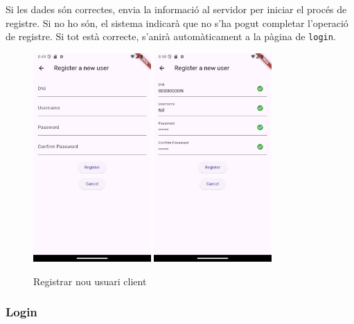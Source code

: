 \documentclass[a4paper,12pt,twoside]{ThesisStyle}
\begin{document}
Si les dades són correctes, envia la informació al servidor per iniciar el procés de registre. Si no ho són, el sistema indicarà que no s'ha pogut completar l'operació de registre. Si tot està correcte, s'anirà automàticament a la pàgina de \texttt{login}.

\begin{figure}[h]
    \centering
    \includegraphics[width=0.4\textwidth]{imatges/registration.png}
    \includegraphics[width=0.4\textwidth]{imatges/registrationwithvalue.png}
    \caption{Registrar nou usuari client}
    \label{fig: registrar nou usuari client}
\end{figure}

\clearpage

\subsubsection{Login}
\label{subsubsec:Login}
\end{document}
